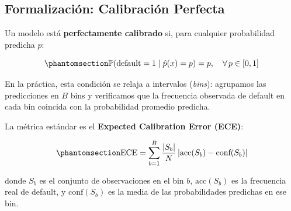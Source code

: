 \documentclass[
  spanish,
  11pt,
  letterpaper,
]{scrbook}
\theoremstyle{plain}
\theoremstyle{remark}
\begin{document}
\subsection{Formalización: Calibración
Perfecta}\label{formalizaciuxf3n-calibraciuxf3n-perfecta}

Un modelo está \textbf{perfectamente calibrado} si, para cualquier
probabilidad predicha \(p\):

\begin{equation}\protect\phantomsection\label{eq-perfect-calibration}{
\mathbb{P}(\text{default} = 1 \mid \hat{p}(x) = p) = p, \quad \forall\, p \in [0, 1]
}\end{equation}

En la práctica, esta condición se relaja a intervalos (\emph{bins}):
agrupamos las predicciones en \(B\) bins y verificamos que la frecuencia
observada de default en cada bin coincida con la probabilidad promedio
predicha.

La métrica estándar es el \textbf{Expected Calibration Error (ECE)}:

\begin{equation}\protect\phantomsection\label{eq-ece}{
\text{ECE} = \sum_{b=1}^{B} \frac{|S_b|}{N} \left| \text{acc}(S_b) - \text{conf}(S_b) \right|
}\end{equation}

donde \(S_b\) es el conjunto de observaciones en el bin \(b\),
\(\text{acc}(S_b)\) es la frecuencia real de default, y
\(\text{conf}(S_b)\) es la media de las probabilidades predichas en ese
bin.
\end{document}
